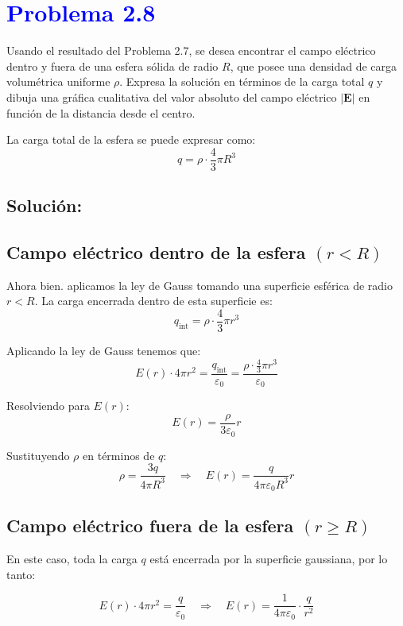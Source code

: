 \documentclass[12pt]{article}
\newcommand{\question}[1]{\textcolor{blue}{\textbf{#1}}}
\begin{document}
\section*{\question{ Problema 2.8}}  

Usando el resultado del Problema 2.7, se desea encontrar el campo eléctrico dentro y fuera de una esfera sólida de radio \( R \), que posee una densidad de carga volumétrica uniforme \( \rho \). Expresa la solución en términos de la carga total \( q \) y dibuja una gráfica cualitativa del valor absoluto del campo eléctrico \( |\mathbf{E}| \) en función de la distancia desde el centro.

\vspace{0.3cm}
La carga total de la esfera se puede expresar como:
\[
q = \rho \cdot \frac{4}{3} \pi R^3
\]

\subsection*{Solución:}

\subsection*{Campo eléctrico dentro de la esfera \((r < R)\)}

Ahora bien. aplicamos la ley de Gauss tomando una superficie esférica de radio \( r < R \). La carga encerrada dentro de esta superficie es:
\[
q_{\text{int}} = \rho \cdot \frac{4}{3} \pi r^3
\]

Aplicando la ley de Gauss tenemos que:
\[
E(r) \cdot 4\pi r^2 = \frac{q_{\text{int}}}{\varepsilon_0} = \frac{\rho \cdot \frac{4}{3} \pi r^3}{\varepsilon_0}
\]

Resolviendo para \( E(r) \):
\[
E(r) = \frac{\rho}{3 \varepsilon_0} r
\]

Sustituyendo \( \rho \) en términos de \( q \):
\[
\rho = \frac{3q}{4\pi R^3} \quad \Rightarrow \quad E(r) = \frac{q}{4\pi \varepsilon_0 R^3} r
\]

\subsection*{Campo eléctrico fuera de la esfera \((r \geq R)\)}

En este caso, toda la carga \( q \) está encerrada por la superficie gaussiana, por lo tanto:

\[
E(r) \cdot 4\pi r^2 = \frac{q}{\varepsilon_0}
\quad \Rightarrow \quad
E(r) = \frac{1}{4\pi \varepsilon_0} \cdot \frac{q}{r^2}
\]
\end{document}
